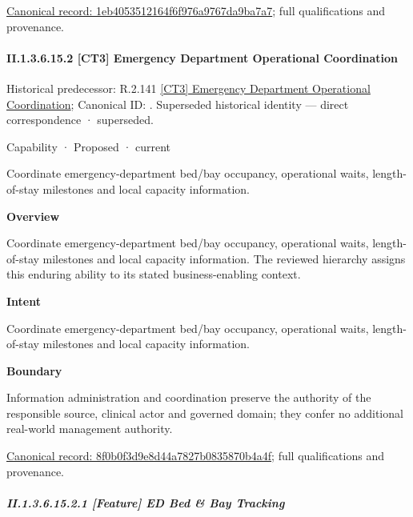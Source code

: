 {\footnotesize \href{../../../../../../../continuum/strategy/capability/feature/1eb4053512164f6f976a9767da9ba7a7.md}{Canonical record: 1eb4053512164f6f976a9767da9ba7a7}; full qualifications and provenance.}\par
\paragraph*{II.1.3.6.15.2 [CT3] Emergency Department Operational Coordination}
\label{navigation:II.1.3.6.15.2}

{\small Historical predecessor: R.2.141 \hyperref[element:15b6d2518e60444098b7c546ca31c49b]{[CT3] Emergency Department Operational Coordination}; Canonical ID: \texttt{}. Superseded historical identity — direct correspondence · superseded.}\par
\label{element:8f0b0f3d9e8d44a7827b0835870b4a4f}
{\small Capability · Proposed · current}\par

Coordinate emergency-department bed/bay occupancy, operational waits, length-of-stay milestones and local capacity information.



\textbf{Overview}



Coordinate emergency-department bed/bay occupancy, operational waits, length-of-stay milestones and local capacity information. The reviewed hierarchy assigns this enduring ability to its stated business-enabling context.



\textbf{Intent}



Coordinate emergency-department bed/bay occupancy, operational waits, length-of-stay milestones and local capacity information.



\textbf{Boundary}



Information administration and coordination preserve the authority of the responsible source, clinical actor and governed domain; they confer no additional real-world management authority.


{\footnotesize \href{../../../../../../../continuum/strategy/capability/8f0b0f3d9e8d44a7827b0835870b4a4f.md}{Canonical record: 8f0b0f3d9e8d44a7827b0835870b4a4f}; full qualifications and provenance.}\par
\subparagraph*{II.1.3.6.15.2.1 [Feature] ED Bed \& Bay Tracking}
\label{navigation:II.1.3.6.15.2.1}

